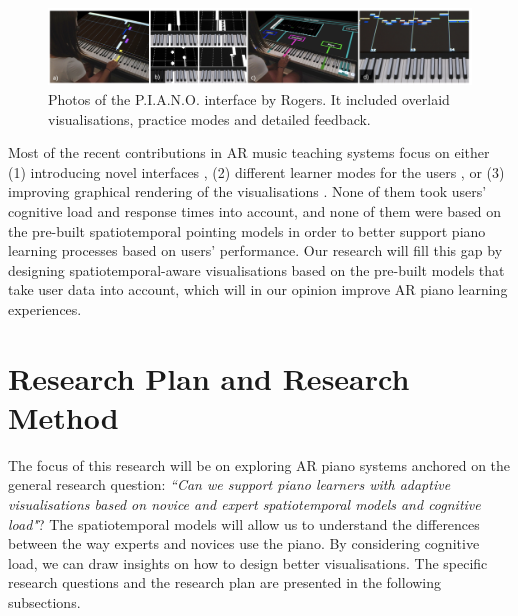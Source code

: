 \documentclass[manuscript,screen]{acmart}
\begin{document}
\begin{itemize}
\end{itemize}

\begin{figure}[h]
\centering
 \includegraphics[width=12cm]{figures/pianoUBC.png}
    \caption{Photos of the P.I.A.N.O. interface by Rogers. It included overlaid visualisations, practice modes and detailed feedback. 
    }\label{fig:ubicomp}
\end{figure}

Most of the recent contributions in AR music teaching systems focus on either (1) introducing novel interfaces \cite{barakonyi2005augmented, huang2011piano}, (2) different learner modes for the users \cite{weing2013piano, rogers2014piano}, or (3) improving graphical rendering of the visualisations \cite{chow2013music, zheng2013general}. None of them took users' cognitive load and response times into account, and none of them were based on the pre-built spatiotemporal pointing models in order to better support piano learning processes based on users' performance. Our research will fill this gap by designing spatiotemporal-aware visualisations based on the pre-built models that take user data into account, which will in our opinion improve AR piano learning experiences.\\

\section{Research Plan and Research Method}
\label{sec:plan}

The focus of this research will be on exploring AR piano systems anchored on the general research question: \textit{``Can we support piano learners with adaptive visualisations based on novice and expert spatiotemporal models and cognitive load"}? The spatiotemporal models will allow us to understand the differences between the way experts and novices use the piano. By considering cognitive load, we can draw insights on how to design better visualisations. The specific research questions and the research plan are presented in the following subsections. 
\end{document}
